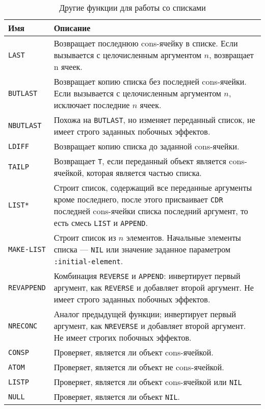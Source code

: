 \begin{table}[h!]
  \caption{Другие функции для работы со списками}
  \begin{center}
    \begin{tabular}{lp{11.5cm}}
      \toprule
      Имя & Описание \\
      \midrule
      \texttt{LAST} & Возвращает последнюю cons-ячейку в списке. Если вызывается с целочисленным аргументом $n$, возвращает n ячеек. \\
      \texttt{BUTLAST} & Возвращает копию списка без последней cons-ячейки. Если вызывается с целочисленным аргументом $n$, исключает последние $n$ ячеек. \\
      \texttt{NBUTLAST} & Похожа на \texttt{BUTLAST}, но изменяет переданный список, не имеет строго заданных побочных эффектов. \\
      \texttt{LDIFF} & Возвращает копию списка до заданной cons-ячейки. \\
      \texttt{TAILP} & Возвращает \texttt{T}, если переданный объект является cons-ячейкой, которая является частью списка. \\
      \texttt{LIST*} & Строит список, содержащий все переданные аргументы кроме последнего, после этого присваивает \texttt{CDR} последней cons-ячейки списка последний аргумент, то есть смесь \texttt{LIST} и \texttt{APPEND}. \\
      \texttt{MAKE-LIST} & Строит список из $n$ элементов. Начальные элементы списка — \texttt{NIL} или значение заданное параметром \texttt{:initial-element}. \\
      \texttt{REVAPPEND} & Комбинация \texttt{REVERSE} и \texttt{APPEND}: инвертирует первый аргумент, как \texttt{REVERSE} и добавляет второй аргумент. Не имеет строго заданных побочных эффектов. \\
      \texttt{NRECONC} & Аналог предыдущей функции; инвертирует первый аргумент, как \texttt{NREVERSE} и добавляет второй аргумент. Не имеет строгих побочных эффектов. \\
      \texttt{CONSP} & Проверяет, является ли объект cons-ячейкой. \\
      \texttt{ATOM} & Проверяет, является ли объект не cons-ячейкой. \\
      \texttt{LISTP} & Проверяет, является ли объект cons-ячейкой или \texttt{NIL} \\
      \texttt{NULL} & Проверяет, является ли объект \texttt{NIL}. \\
      \bottomrule
    \end{tabular}
  \end{center}
\end{table}

